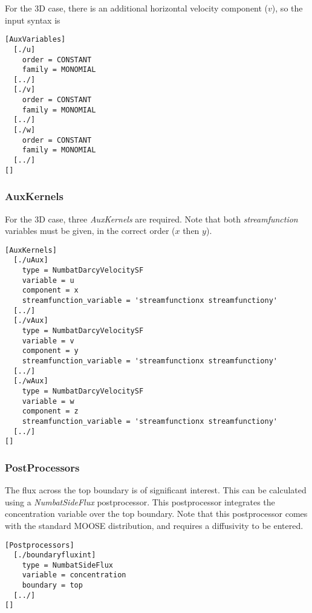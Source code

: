\documentclass[11pt, a4paper]{csiroreport2012}
\begin{document}
For the 3D case, there is an additional horizontal velocity component ($v$), so the input syntax is
\begin{shaded}
\begin{verbatim}
[AuxVariables]
  [./u]
    order = CONSTANT
    family = MONOMIAL
  [../]
  [./v]
    order = CONSTANT
    family = MONOMIAL
  [../]
  [./w]
    order = CONSTANT
    family = MONOMIAL
  [../]
[]
\end{verbatim}
\end{shaded}

\subsubsection*{AuxKernels}

For the 3D case, three \emph{AuxKernels} are required. Note that both \emph{streamfunction} variables must be given, in the correct order ($x$ then $y$).
\begin{shaded}
\begin{verbatim}
[AuxKernels]
  [./uAux]
    type = NumbatDarcyVelocitySF
    variable = u
    component = x
    streamfunction_variable = 'streamfunctionx streamfunctiony'
  [../]
  [./vAux]
    type = NumbatDarcyVelocitySF
    variable = v
    component = y
    streamfunction_variable = 'streamfunctionx streamfunctiony'
  [../]
  [./wAux]
    type = NumbatDarcyVelocitySF
    variable = w
    component = z
    streamfunction_variable = 'streamfunctionx streamfunctiony'
  [../]
[]
\end{verbatim}
\end{shaded}

\subsubsection*{PostProcessors}

The flux across the top boundary is of significant interest. This can be calculated using a \emph{NumbatSideFlux} postprocessor. This postprocessor integrates the concentration variable over the top boundary. Note that this postprocessor comes with the standard MOOSE distribution, and requires a diffusivity to be entered.

\begin{shaded}
\begin{verbatim}
[Postprocessors]
  [./boundaryfluxint]
    type = NumbatSideFlux
    variable = concentration
    boundary = top
  [../]
[]
\end{verbatim}
\end{shaded}
\end{document}
